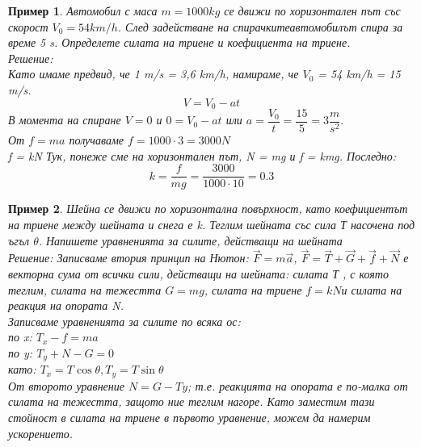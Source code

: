 \documentclass[fleqn, 12pt]{article}
\newtheorem{example}{Пример}[subsection]
\begin{document}
\begin{example}
Автомобил с маса $m = 1000 kg$ се движи по хоризонтален път със скорост $V_0 = 54 km/h$. След задействане на спирачкитеавтомобилът спира за време 5 s. Определете силата на триене и коефициента на триене.\\
Решение: \\
Като имаме предвид, че 1 m/s = 3,6 km/h, намираме, че $V_0$ = 54 km/h = 15 m/s. \\
$$V = V_0 - at$$
В момента на спиране $V = 0$ и $0 = V_0 - at$ или $a = \dfrac{V_0}{t} = \dfrac{15}{5} = 3 \dfrac{m}{s^2}. $\\
От $f = ma$ получаваме $f =1000 \cdot 3 = 3000 N$ \\
f = kN Тук, понеже сме на хоризонтален път, N = mg и f = kmg. Последно:
$$k = \dfrac{f}{mg} = \dfrac{3000}{1000 \cdot 10} = 0.3$$
\end{example}

\begin{example}
Шейна се движи по хоризонтална повърхност, като коефициентът на триене между шейната и снега е k. Теглим шейната със сила Т насочена под ъгъл $\theta$. Напишете уравненията за силите, действащи на шейната \\
Решение: 
Записваме втория принцип на Нютон: $\vec{F} = m \vec{a}$, $\vec{F} = \vec{T} + \vec{G} + \vec{f} + \vec{N}$ е векторна сума от всички сили, действащи на шейната: силата Т , с която теглим, силата на тежестта $G = mg$, силата на триене $f = kN$и силата на реакция на опората N. \\
Записваме уравненията за силите по всяка ос: \\
по x: $T_x - f = ma $\\
по y: $ T_y + N - G = 0$\\
като: $ T_x = T \cos{\theta}, T_y = T \sin{\theta}$ \\
От второто уравнение $N = G - Ty$; т.е. реакцията на опората е по-малка от силата на тежестта, защото ние теглим нагоре. Като заместим тази стойност в силата на триене в първото уравнение, можем да намерим ускорението.
\end{example}
\end{document}
